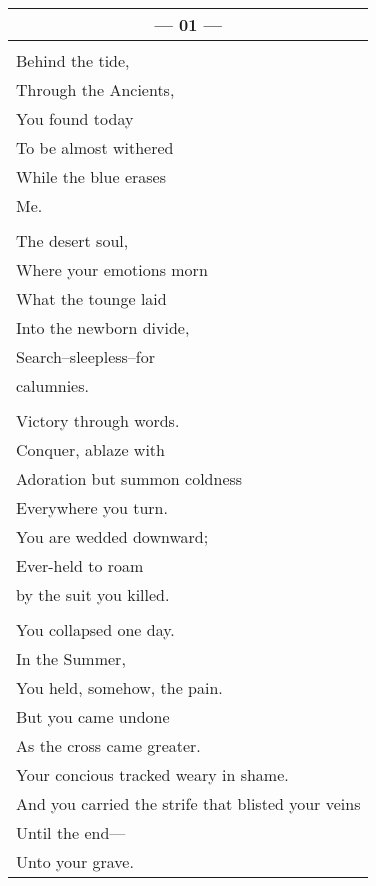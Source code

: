 \documentclass{article}
\begin{document}
\begin{center}
\begin{tabular}{l}
\multicolumn{1}{c}{\textbf{--- 01 ---}} \\ \hline
\\
Behind the tide, \\
Through the Ancients, \\
You found today \\
To be almost withered \\
While the blue erases \\
Me. \\
\\
The desert soul, \\
Where your emotions morn \\
What the tounge laid \\
Into the newborn divide, \\
Search--sleepless--for \\
calumnies. \\
\\
Victory through words. \\
Conquer, ablaze with \\
Adoration but summon coldness \\
Everywhere you turn. \\
You are wedded downward; \\
Ever-held to roam \\
by the suit you killed. \\
\\
You collapsed one day. \\
In the Summer, \\
You held, somehow, the pain. \\
But you came undone \\
As the cross came greater. \\
Your concious tracked weary in shame. \\
And you carried the strife that blisted your veins \\
Until the end--- \\
Unto your grave.
\end{tabular}
\end{center}

\newpage
\end{document}
